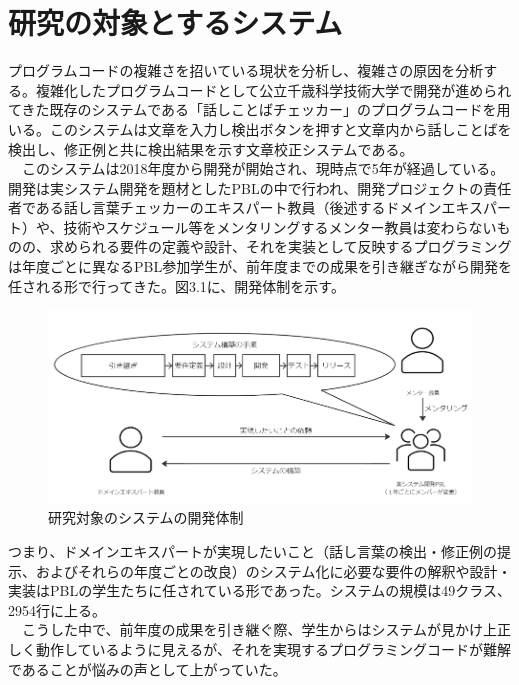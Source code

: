 \documentclass[12pt, a4paper]{jreport}
\begin{document}
\section{研究の対象とするシステム}
プログラムコードの複雑さを招いている現状を分析し、複雑さの原因を分析する。複雑化したプログラムコードとして公立千歳科学技術大学で開発が進められてきた既存のシステムである「話しことばチェッカー」のプログラムコードを用いる。このシステムは文章を入力し検出ボタンを押すと文章内から話しことばを検出し、修正例と共に検出結果を示す文章校正システムである。
\\　このシステムは2018年度から開発が開始され、現時点で5年が経過している。開発は実システム開発を題材としたPBLの中で行われ、開発プロジェクトの責任者である話し言葉チェッカーのエキスパート教員（後述するドメインエキスパート）や、技術やスケジュール等をメンタリングするメンター教員は変わらないものの、求められる要件の定義や設計、それを実装として反映するプログラミングは年度ごとに異なるPBL参加学生が、前年度までの成果を引き継ぎながら開発を任される形で行ってきた。図3.1に、開発体制を示す。
\begin{figure}[H]
\centering
\includegraphics[width=1\linewidth]{image/taisyou1.1.png}
\caption{研究対象のシステムの開発体制}
\label{fig:enter-label}
\end{figure}
つまり、ドメインエキスパートが実現したいこと（話し言葉の検出・修正例の提示、およびそれらの年度ごとの改良）のシステム化に必要な要件の解釈や設計・実装はPBLの学生たちに任されている形であった。システムの規模は49クラス、2954行に上る。
\\　こうした中で、前年度の成果を引き継ぐ際、学生からはシステムが見かけ上正しく動作しているように見えるが、それを実現するプログラミングコードが難解であることが悩みの声として上がっていた。
\end{document}
